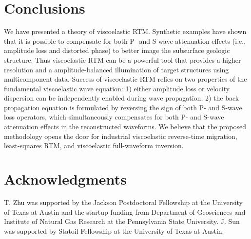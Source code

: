 \section{Conclusions}
We have presented a theory of viscoelastic RTM. Synthetic examples have shown that it is possible to compensate for both P- and S-wave attenuation effects (i.e., amplitude loss and distorted phase) to better image the subsurface geologic structure. Thus viscoelastic RTM can be a powerful tool that provides a higher resolution and a amplitude-balanced illumination of target structures using multicomponent data. Success of viscoelastic RTM relies on two properties of the fundamental viscoelastic wave equation: 1) either amplitude loss or velocity dispersion can be independently enabled during wave propagation; 2) the back propagation equation is formulated by reversing the sign of both P- and S-wave loss operators, which simultaneously compensates for both P- and S-wave attenuation effects in the reconstructed waveforms. We believe that the proposed methodology opens the door for industrial viscoelastic reverse-time migration, least-squares RTM, and viscoelastic full-waveform inversion. 

\section{Acknowledgments}
T. Zhu was supported by the Jackson Postdoctoral Fellowship at the University of Texas at Austin and the startup funding from Department of Geosciences and Institute of Natural Gas Research at the Pennsylvania State University. J. Sun was supported by Statoil Fellowship at the University of Texas at Austin. 

\onecolumn




